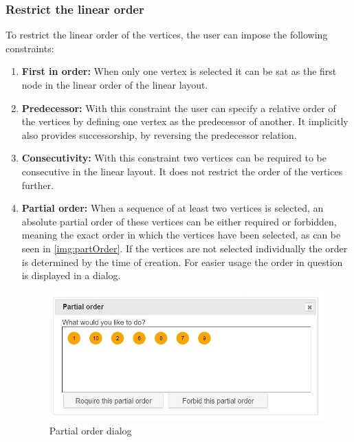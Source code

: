 \subsubsection{Restrict the linear order}
\label{linRestr}
To restrict the linear order of the vertices, the user can impose the following constraints:
\begin{enumerate}
\item \textbf{First in order:} When only one vertex is selected it can be sat as the first node in the linear order of the linear layout.
\item \textbf{Predecessor:} With this constraint the user can specify a relative order of the vertices by defining one vertex as the predecessor of another. It implicitly also provides successorship, by reversing the predecessor relation.
\item \textbf{Consecutivity:} With this constraint two vertices can be required to be consecutive in the linear layout. It does not restrict the order of the vertices further.
\item \textbf{Partial order:} When a sequence of at least two vertices is selected, an absolute partial order of these vertices can be either required or forbidden, meaning the exact order in which the vertices have been selected, as can be seen in \autoref{img:partOrder}. If the vertices are not selected individually the order is determined by the time of creation. For easier usage the order in question is displayed in a dialog. 
\begin{figure}
\begin{center}
\includegraphics[width=\textwidth]{figures/figIndex/PartialOrder.jpg}
\caption{Partial order dialog}
\label{img:partOrder}
\end{center}
\end{figure}
\end{enumerate}

